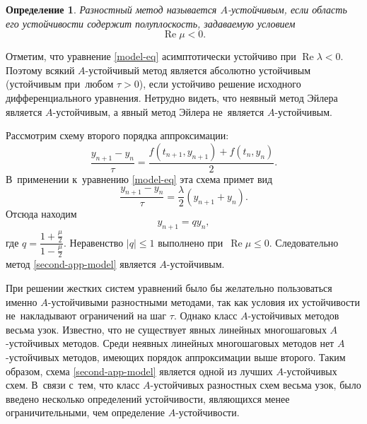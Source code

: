 \documentclass[11pt,a4paper,twoside]{report}
\numberwithin{equation}{section}
\newtheorem*{definition}{Определение}
\theoremstyle{definition}
\theoremstyle{plain}
\begin{document}
%
\begin{figure}[H]
    \centering
\end{figure}
%

\begin{definition}
    Разностный метод называется $A$-устойчивым, если область его устойчивости
    содержит полуплоскость, задаваемую условием
    $$
        \operatorname{Re}\mu < 0.
    $$
\end{definition}
Отметим, что уравнение \eqref{model-eq} асимптотически устойчиво при
$\operatorname{Re}\lambda < 0.$ Поэтому всякий $A$-устойчивый метод является
абсолютно устойчивым (устойчивым при~любом $\tau > 0$), если устойчиво решение
исходного дифференциального уравнения.
Нетрудно видеть, что неявный метод Эйлера является $A$-устойчивым, а явный метод
Эйлера не~является $A$-устойчивым.

Рассмотрим схему второго порядка аппроксимации:
%
\begin{equation}
    \label{second-app-model}
    \dfrac{y_{n+1}-y_n}{\tau} = \dfrac{f(t_{n+1},y_{n+1}) + f(t_n,y_n)}{2}.
\end{equation}
%
В~применении к~уравнению \eqref{model-eq} эта схема примет вид
%
$$
    \dfrac{y_{n+1}-y_n}{\tau} = \frac{\lambda}{2}(y_{n+1}+y_n).
$$
%
Отсюда находим
%
$$
    y_{n+1}=qy_n,
$$
%
где $q=\dfrac{1+\frac{\mu}{2}}{1-\frac{\mu}{2}}.$ Неравенство
$|q|\leqslant1$
выполнено при~$\operatorname{Re}\mu\leqslant0$. Следовательно метод
\eqref{second-app-model} является $A$-устойчивым.

При решении жестких систем уравнений было бы желательно пользоваться именно
$A$-устойчивыми разностными методами, так как условия их устойчивости не~накладывают
ограничений на шаг $\tau$. Однако класс $A$-устойчивых методов весьма узок. Известно,
что не существует явных линейных многошаговых $A$-устойчивых методов.
Среди неявных линейных многошаговых методов нет $A$-устойчивых методов, имеющих
порядок аппроксимации выше второго. Таким образом, схема \eqref{second-app-model}
является одной из лучших $A$-устойчивых схем. В~связи с~тем, что класс $A$-устойчивых
разностных схем весьма узок, было введено
несколько определений устойчивости, являющихся менее ограничительными, чем определение
$A$-устойчивости.
\end{document}
